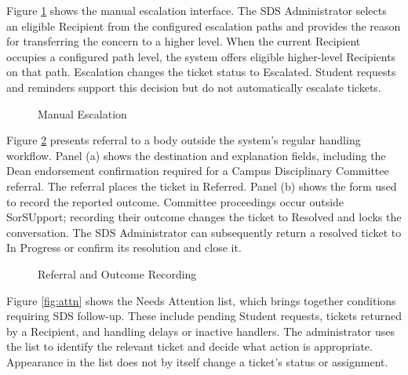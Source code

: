 Figure \ref{fig:esc} shows the manual escalation interface. The SDS Administrator selects an eligible Recipient from the configured escalation paths and provides the reason for transferring the concern to a higher level. When the current Recipient occupies a configured path level, the system offers eligible higher-level Recipients on that path. Escalation changes the ticket status to Escalated. Student requests and reminders support this decision but do not automatically escalate tickets.

\renewcommand{\thefigure}{5.26}
\begin{figure}[htbp]
    \centering
    \caption{Manual Escalation}
    \label{fig:esc}
\end{figure}
\FloatBarrier

Figure \ref{fig:refer} presents referral to a body outside the system's regular handling workflow. Panel (a) shows the destination and explanation fields, including the Dean endorsement confirmation required for a Campus Disciplinary Committee referral. The referral places the ticket in Referred. Panel (b) shows the form used to record the reported outcome. Committee proceedings occur outside SorSUpport; recording their outcome changes the ticket to Resolved and locks the conversation. The SDS Administrator can subsequently return a resolved ticket to In Progress or confirm its resolution and close it.

\renewcommand{\thefigure}{5.27}
\begin{figure}[htbp]
    \centering
    \par{}\par
    \medskip
    \par{}\par
    \caption{Referral and Outcome Recording}
    \label{fig:refer}
\end{figure}
\FloatBarrier

Figure \ref{fig:attn} shows the Needs Attention list, which brings together conditions requiring SDS follow-up. These include pending Student requests, tickets returned by a Recipient, and handling delays or inactive handlers. The administrator uses the list to identify the relevant ticket and decide what action is appropriate. Appearance in the list does not by itself change a ticket's status or assignment.

